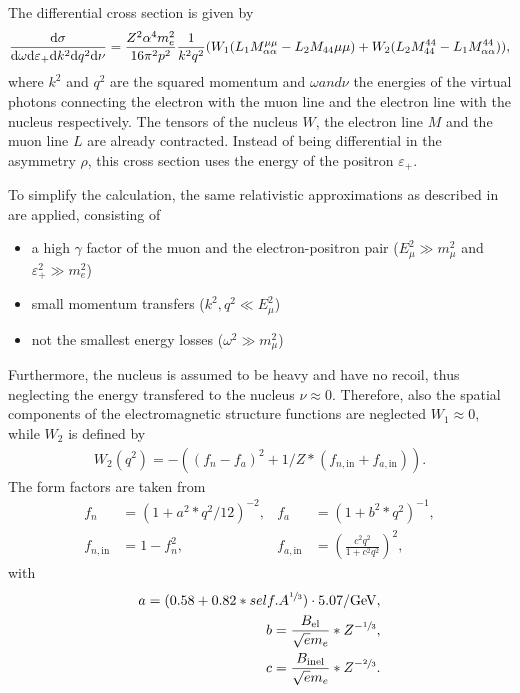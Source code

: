 The differential cross section is given by
\begin{align}
    \frac{\mathrm{d} \sigma}{\mathrm{d} \omega \mathrm{d} \varepsilon_+ \mathrm{d} k^2 \mathrm{d} q^2 \mathrm{d} \nu} =
        \frac{Z^2 \alpha^4 m_e^2}{16 \pi^2 p^2} \frac{1}{k^2 q^2}
        (W_1(L_1 M_{\alpha \alpha}^{\mu \mu} - L_2 M_{44}{\mu \mu})
        + W_2 (L_2 M_{44}^{44} - L_1 M_{\alpha \alpha}^{44})) ,
\end{align}
where $k^2$ and $q^2$ are the squared momentum and $\omega and \nu$ the energies of the virtual photons connecting the electron with the muon line and the electron line with the nucleus respectively.
The tensors of the nucleus $W$, the electron line $M$ and the muon line $L$ are already contracted.
Instead of being differential in the asymmetry $\rho$, this cross section uses the energy of the positron $\varepsilon_+$.

To simplify the calculation, the same relativistic approximations as described in \cite{Bugaev77} are applied, consisting of
\begin{itemize}
    \item a high $\gamma$ factor of the muon and the electron-positron pair ($E_\mu^2 \gg m_\mu^2$ and $\varepsilon_+^2 \gg m_e^2$)
    \item small momentum transfers ($k^2, q^2 \ll E_\mu^2$)
    \item not the smallest energy losses ($\omega^2 \gg m_\mu^2$)
\end{itemize}
Furthermore, the nucleus is assumed to be heavy and have no recoil, thus neglecting the energy transfered to the nucleus $\nu \approx 0$.
Therefore, also the spatial components of the electromagnetic structure functions are neglected $W_1 \approx 0$, while $W_2$ is defined by
\begin{align}
    W_2 (q^2) = -((f_n - f_a)^2 + 1/Z*(f_{n,\mathrm{in}} + f_{a,\mathrm{in}})) .
\end{align}
The form factors are taken from \cite{Tsai74, Tsai77, Andreev94Brems}
\begin{subequations}
\begin{align}
        f_n &= (1 + a^2 * q^2/12)^{-2}, %
        & f_a &= (1 + b^2 * q^2)^{-1}, \\
        f_{n,\mathrm{in}} &= 1 - f_n^2,
        & f_{a,\mathrm{in}} &= \left(\frac{c^2 q^2}{1 + c^2 q^2} \right)^2 ,
\end{align}
\end{subequations}
with
\begin{subequations}
\begin{align}
    a = (0.58 + 0.82*self.A^{\sfrac13}) \cdot 5.07/\si{GeV},
    \\
    b = \frac{B_{\mathrm{el}}}{\sqrt{e} m_e} * Z^{-\sfrac13},
    \\
    c = \frac{B_{\mathrm{inel}}}{\sqrt{e} m_e} * Z^{-\sfrac23}.
\end{align}
\end{subequations}

